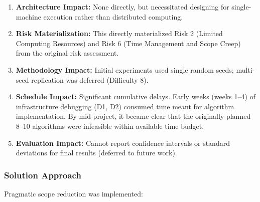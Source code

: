 \begin{enumerate}
    \item \textbf{Architecture Impact:} None directly, but necessitated designing for single-machine execution rather than distributed computing.
    
    \item \textbf{Risk Materialization:} This directly materialized Risk 2 (Limited Computing Resources) and Risk 6 (Time Management and Scope Creep) from the original risk assessment.
    
    \item \textbf{Methodology Impact:} Initial experiments used single random seeds; multi-seed replication was deferred (Difficulty 8).
    
    \item \textbf{Schedule Impact:} Significant cumulative delays. Early weeks (weeks 1--4) of infrastructure debugging (D1, D2) consumed time meant for algorithm implementation. By mid-project, it became clear that the originally planned 8--10 algorithms were infeasible within available time budget.
    
    \item \textbf{Evaluation Impact:} Cannot report confidence intervals or standard deviations for final results (deferred to future work).
\end{enumerate}

\subsubsection{Solution Approach}

Pragmatic scope reduction was implemented:

